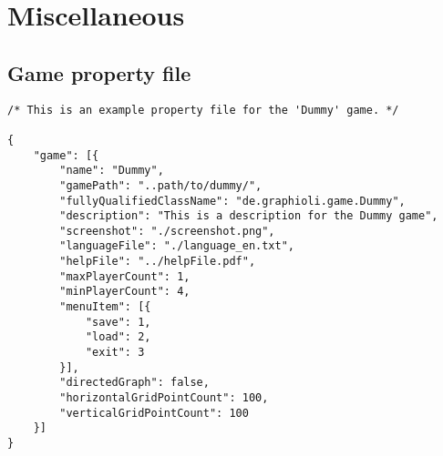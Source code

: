 \section{Miscellaneous}
\subsection{Game property file}

\begin{lstlisting}[caption=An example of a property file]
/* This is an example property file for the 'Dummy' game. */

{
    "game": [{
        "name": "Dummy",
        "gamePath": "..path/to/dummy/",
        "fullyQualifiedClassName": "de.graphioli.game.Dummy",
        "description": "This is a description for the Dummy game",
        "screenshot": "./screenshot.png",
        "languageFile": "./language_en.txt",
        "helpFile": "../helpFile.pdf",
        "maxPlayerCount": 1,
        "minPlayerCount": 4,
        "menuItem": [{
            "save": 1,
            "load": 2,
            "exit": 3
        }],
        "directedGraph": false,
        "horizontalGridPointCount": 100,
        "verticalGridPointCount": 100
    }]
}
\end{lstlisting}
